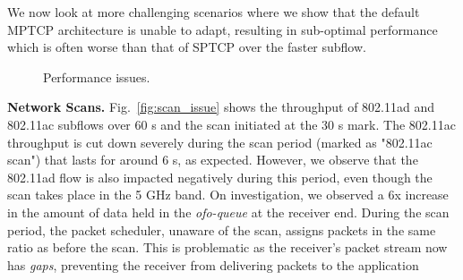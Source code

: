 We now look at more challenging scenarios where we show that the 
default MPTCP architecture is unable to adapt, resulting in sub-optimal 
performance which is often worse than that of SPTCP over the
faster subflow.

\begin{figure*}[ht]
    \centering
    \hfill
    \hfill
    \vspace{-0.15in}
    \caption{Performance issues.}
\end{figure*}
\fi

\noindent\textbf{Network Scans. }Fig.~\ref{fig:scan_issue} shows the throughput of 802.11ad
and 802.11ac subflows over 60 s and the scan initiated at the 30 s mark. The 802.11ac throughput 
is cut down severely during the scan period (marked as "802.11ac scan") that lasts for 
around 6 s, as expected.
However, we observe that the 802.11ad flow is also impacted negatively during this period, even though the scan takes place in the 
5 GHz band. On investigation, we observed a 6x increase in the amount of data held in 
the \emph{ofo-queue} at the receiver end. During the scan period, the packet
scheduler, unaware of the scan, assigns packets in the same ratio as before the scan. This is 
problematic as the receiver's packet stream now has \textit{gaps}, 
preventing the receiver from delivering packets to the application 

